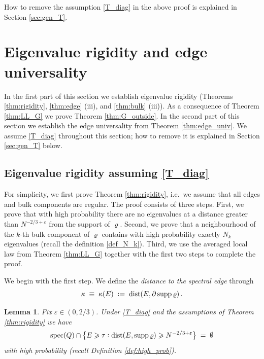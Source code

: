 \documentclass[11pt]{article} %
\numberwithin{equation}{section}
\numberwithin{figure}{section}
\theoremstyle{plain} %
\newtheorem{lemma}[theorem]{Lemma}
\theoremstyle{definition} %
\newcommand{\col}{\mathrel{\vcenter{\baselineskip0.75ex \lineskiplimit0pt \hbox{.}\hbox{.}}}}
\newcommand*{\deq}{\mathrel{\vcenter{\baselineskip0.65ex \lineskiplimit0pt \hbox{.}\hbox{.}}}=}
\renewcommand{\geq}{\geqslant}
\renewcommand{\epsilon}{\varepsilon}
\newcommand{\hb}[1]{\bigl\{{#1}\bigr\}}
\DeclareMathOperator{\supp}{supp}
\DeclareMathOperator{\dist}{dist}
\DeclareMathOperator{\spec}{spec}
\begin{document}
How to remove the assumption \eqref{T_diag} in the above proof is explained in Section \ref{sec:gen_T}.



\section{Eigenvalue rigidity and edge universality} \label{sec:rigidity}


In the first part of this section we establish eigenvalue rigidity (Theorems \ref{thm:rigidity}, \ref{thm:edge} (iii), and \ref{thm:bulk} (iii)).  As a consequence of Theorem \ref{thm:LL_G} we prove Theorem \ref{thm:G_outside}. In the second part of this section we establish the edge universality from Theorem \ref{thm:edge_univ}. We assume \eqref{T_diag} throughout this section; how to remove it is explained in Section \ref{sec:gen_T} below.

\subsection{Eigenvalue rigidity assuming \eqref{T_diag}}
For simplicity, we first prove Theorem \ref{thm:rigidity}, i.e.\ we assume that all edges and bulk components are regular. The proof consists of three steps. First, we prove that with high probability there are no eigenvalues at a distance greater than $N^{-2/3 + \epsilon}$ from the support of $\varrho$. Second, we prove that a neighbourhood of the $k$-th bulk component of $\varrho$ contains with high probability exactly $N_k$ eigenvalues (recall the definition \eqref{def_N_k}). Third, we use the averaged local law from Theorem \ref{thm:LL_G} together with the first two steps to complete the proof.

We begin with the first step. We define the \emph{distance to the spectral edge} through 
\begin{equation} \label{def_kappa}
\kappa \;\equiv\; \kappa(E) \;\deq\; \dist (E, \partial \supp \varrho)\,.
\end{equation}

\begin{lemma} \label{lem:gap}
Fix $\epsilon \in (0,2/3)$. Under \eqref{T_diag} and the assumptions of Theorem \ref{thm:rigidity} we have
\begin{equation*}
\spec(Q) \cap \hb{E \geq \tau \col \dist(E, \supp \varrho) \geq N^{-2/3 + \epsilon}} \;=\; \emptyset
\end{equation*}
with high probability (recall Definition \ref{def:high_prob}).
\end{lemma}
\end{document}
